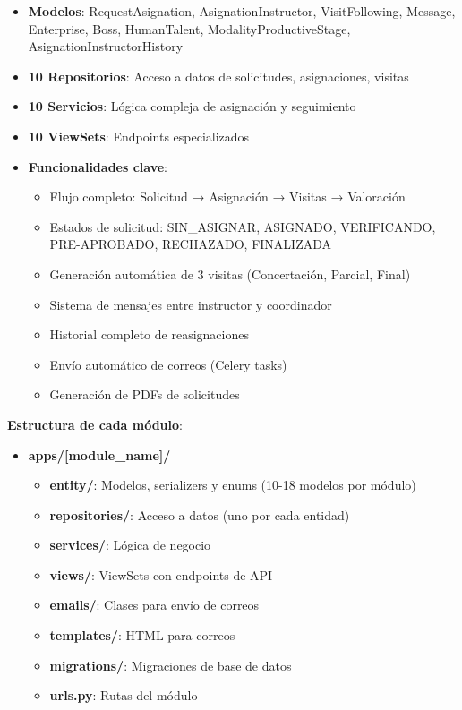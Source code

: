 \begin{itemize}
    \item \textbf{Modelos}: RequestAsignation, AsignationInstructor, VisitFollowing, Message, Enterprise, Boss, HumanTalent, ModalityProductiveStage, AsignationInstructorHistory
    \item \textbf{10 Repositorios}: Acceso a datos de solicitudes, asignaciones, visitas
    \item \textbf{10 Servicios}: Lógica compleja de asignación y seguimiento
    \item \textbf{10 ViewSets}: Endpoints especializados
    \item \textbf{Funcionalidades clave}:
    \begin{itemize}
        \item Flujo completo: Solicitud → Asignación → Visitas → Valoración
        \item Estados de solicitud: SIN\_ASIGNAR, ASIGNADO, VERIFICANDO, PRE-APROBADO, RECHAZADO, FINALIZADA
        \item Generación automática de 3 visitas (Concertación, Parcial, Final)
        \item Sistema de mensajes entre instructor y coordinador
        \item Historial completo de reasignaciones
        \item Envío automático de correos (Celery tasks)
        \item Generación de PDFs de solicitudes
    \end{itemize}
\end{itemize}

\textbf{Estructura de cada módulo}:

\begin{itemize}
    \item \textbf{apps/[module\_name]/}
    \begin{itemize}
        \item \textbf{entity/}: Modelos, serializers y enums (10-18 modelos por módulo)
        \item \textbf{repositories/}: Acceso a datos (uno por cada entidad)
        \item \textbf{services/}: Lógica de negocio
        \item \textbf{views/}: ViewSets con endpoints de API
        \item \textbf{emails/}: Clases para envío de correos
        \item \textbf{templates/}: HTML para correos
        \item \textbf{migrations/}: Migraciones de base de datos
        \item \textbf{urls.py}: Rutas del módulo
    \end{itemize}
\end{itemize}

